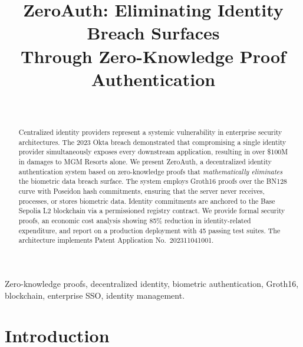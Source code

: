 \documentclass[journal, letterpaper, 10pt]{IEEEtran}
\begin{document}
\title{ZeroAuth: Eliminating Identity Breach Surfaces\\Through Zero-Knowledge Proof Authentication}

\author{%
  \\
}


\maketitle

\begin{abstract}
Centralized identity providers represent a systemic vulnerability in enterprise security architectures. The 2023 Okta breach demonstrated that compromising a single identity provider simultaneously exposes every downstream application, resulting in over \$100M in damages to MGM Resorts alone. We present ZeroAuth, a decentralized identity authentication system based on zero-knowledge proofs that \emph{mathematically eliminates} the biometric data breach surface. The system employs Groth16 proofs over the BN128 curve with Poseidon hash commitments, ensuring that the server never receives, processes, or stores biometric data. Identity commitments are anchored to the Base Sepolia L2 blockchain via a permissioned registry contract. We provide formal security proofs, an economic cost analysis showing 85\% reduction in identity-related expenditure, and report on a production deployment with 45 passing test suites. The architecture implements Patent Application No.\ 202311041001.
\end{abstract}

\begin{IEEEkeywords}
Zero-knowledge proofs, decentralized identity, biometric authentication, Groth16, blockchain, enterprise SSO, identity management.
\end{IEEEkeywords}

\section{Introduction}
\end{document}
